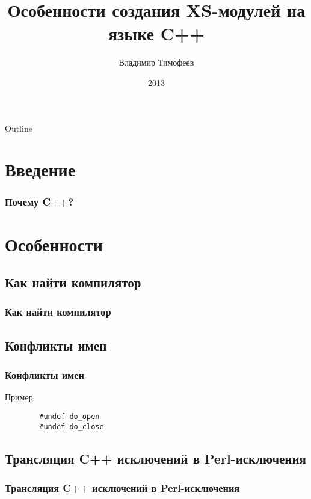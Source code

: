 \documentclass[utf8x]{beamer}
\title{Особенности создания XS-модулей на языке C++}
\author{Владимир Тимофеев}
\date{2013}
\begin{document}
\lstset{language=C}

\begin{frame}
    \titlepage
\end{frame}

\begin{frame}{Outline}
    \tableofcontents
\end{frame}

\section{Введение}

\begin{frame}
    \frametitle{Почему C++?}
\end{frame}

\section{Особенности}

\subsection{Как найти компилятор}

\begin{frame}
    \frametitle{Как найти компилятор}
\end{frame}

\subsection{Конфликты имен}

\begin{frame}[fragile]
    \frametitle{Конфликты имен}
    \begin{exampleblock}{Пример}
        \begin{lstlisting}
        #undef do_open
        #undef do_close
        \end{lstlisting}
    \end{exampleblock}
\end{frame}

\subsection{Трансляция C++ исключений в Perl-исключения}

\begin{frame}
    \frametitle{Трансляция C++ исключений в Perl-исключения}
\end{frame}
\end{document}
